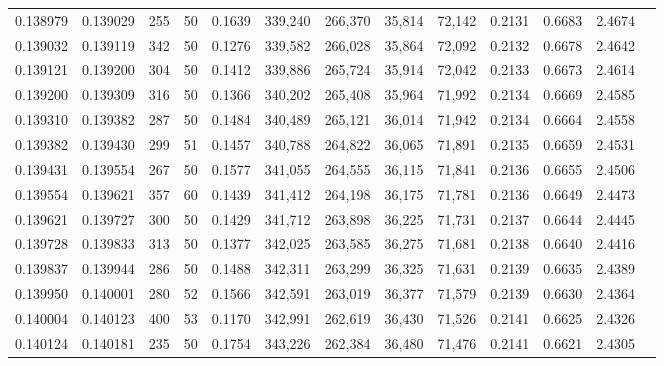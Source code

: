 \begin{tabular}{rrrrrrrrrrrrr}
0.138979 & 0.139029 &   255 &  50 &                                     0.1639 & 339,240 & 266,370 &  35,814 &  72,142 & 0.2131 & 0.6683 & 2.4674 \\
0.139032 & 0.139119 &   342 &  50 &                                     0.1276 & 339,582 & 266,028 &  35,864 &  72,092 & 0.2132 & 0.6678 & 2.4642 \\
0.139121 & 0.139200 &   304 &  50 &                                     0.1412 & 339,886 & 265,724 &  35,914 &  72,042 & 0.2133 & 0.6673 & 2.4614 \\
0.139200 & 0.139309 &   316 &  50 &                                     0.1366 & 340,202 & 265,408 &  35,964 &  71,992 & 0.2134 & 0.6669 & 2.4585 \\
0.139310 & 0.139382 &   287 &  50 &                                     0.1484 & 340,489 & 265,121 &  36,014 &  71,942 & 0.2134 & 0.6664 & 2.4558 \\
0.139382 & 0.139430 &   299 &  51 &                                     0.1457 & 340,788 & 264,822 &  36,065 &  71,891 & 0.2135 & 0.6659 & 2.4531 \\
0.139431 & 0.139554 &   267 &  50 &                                     0.1577 & 341,055 & 264,555 &  36,115 &  71,841 & 0.2136 & 0.6655 & 2.4506 \\
0.139554 & 0.139621 &   357 &  60 &                                     0.1439 & 341,412 & 264,198 &  36,175 &  71,781 & 0.2136 & 0.6649 & 2.4473 \\
0.139621 & 0.139727 &   300 &  50 &                                     0.1429 & 341,712 & 263,898 &  36,225 &  71,731 & 0.2137 & 0.6644 & 2.4445 \\
0.139728 & 0.139833 &   313 &  50 &                                     0.1377 & 342,025 & 263,585 &  36,275 &  71,681 & 0.2138 & 0.6640 & 2.4416 \\
0.139837 & 0.139944 &   286 &  50 &                                     0.1488 & 342,311 & 263,299 &  36,325 &  71,631 & 0.2139 & 0.6635 & 2.4389 \\
0.139950 & 0.140001 &   280 &  52 &                                     0.1566 & 342,591 & 263,019 &  36,377 &  71,579 & 0.2139 & 0.6630 & 2.4364 \\
0.140004 & 0.140123 &   400 &  53 &                                     0.1170 & 342,991 & 262,619 &  36,430 &  71,526 & 0.2141 & 0.6625 & 2.4326 \\
0.140124 & 0.140181 &   235 &  50 &                                     0.1754 & 343,226 & 262,384 &  36,480 &  71,476 & 0.2141 & 0.6621 & 2.4305 \\

\end{tabular}
